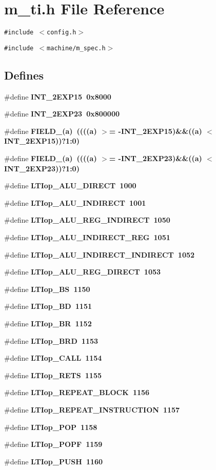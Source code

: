 \section{m\_\-ti.h File Reference}
\label{m__ti_8h}
{\tt \#include $<$config.h$>$}\par
{\tt \#include $<$machine/m\_\-spec.h$>$}\par
\subsection*{Defines}
\begin{CompactItemize}
\item 
\#define \bf{INT\_\-2EXP15}~0x8000
\item 
\#define \bf{INT\_\-2EXP23}~0x800000
\item 
\#define \bf{FIELD\_}(a)~((((a) $>$= -INT\_\-2EXP15)\&\&((a) $<$ INT\_\-2EXP15))?1:0)
\item 
\#define \bf{FIELD\_}(a)~((((a) $>$= -INT\_\-2EXP23)\&\&((a) $<$ INT\_\-2EXP23))?1:0)
\item 
\#define \bf{LTIop\_\-ALU\_\-DIRECT}~1000
\item 
\#define \bf{LTIop\_\-ALU\_\-INDIRECT}~1001
\item 
\#define \bf{LTIop\_\-ALU\_\-REG\_\-INDIRECT}~1050
\item 
\#define \bf{LTIop\_\-ALU\_\-INDIRECT\_\-REG}~1051
\item 
\#define \bf{LTIop\_\-ALU\_\-INDIRECT\_\-INDIRECT}~1052
\item 
\#define \bf{LTIop\_\-ALU\_\-REG\_\-DIRECT}~1053
\item 
\#define \bf{LTIop\_\-BS}~1150
\item 
\#define \bf{LTIop\_\-BD}~1151
\item 
\#define \bf{LTIop\_\-BR}~1152
\item 
\#define \bf{LTIop\_\-BRD}~1153
\item 
\#define \bf{LTIop\_\-CALL}~1154
\item 
\#define \bf{LTIop\_\-RETS}~1155
\item 
\#define \bf{LTIop\_\-REPEAT\_\-BLOCK}~1156
\item 
\#define \bf{LTIop\_\-REPEAT\_\-INSTRUCTION}~1157
\item 
\#define \bf{LTIop\_\-POP}~1158
\item 
\#define \bf{LTIop\_\-POPF}~1159
\item 
\#define \bf{LTIop\_\-PUSH}~1160
\item 

\end{CompactItemize}
